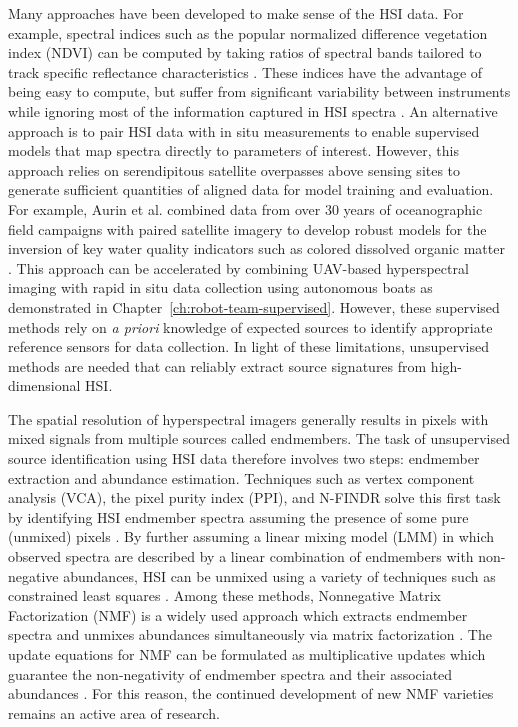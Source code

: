 Many approaches have been developed to make sense of the HSI data. For example,
spectral indices such as the popular normalized difference vegetation index
(NDVI) can be computed by taking ratios of spectral bands tailored to track
specific reflectance characteristics
\cite{thenkabail-indices,thenkabail2018hyperspectral}. These indices have the
advantage of being easy to compute, but suffer from significant variability
between instruments while ignoring most of the information captured in HSI
spectra \cite{ndvi-variability}. An alternative approach is to pair HSI data
with in situ measurements to enable supervised models that map spectra directly
to parameters of interest. However, this approach relies on serendipitous
satellite overpasses above sensing sites to generate sufficient quantities of
aligned data for model training and evaluation. For example, Aurin et al.
combined data from over 30 years of oceanographic field campaigns with paired
satellite imagery to develop robust models for the inversion of key water
quality indicators such as colored dissolved organic matter
\cite{aurin2018remote}. This approach can be accelerated by combining UAV-based
hyperspectral imaging with rapid in situ data collection using autonomous boats
as demonstrated in Chapter~\ref{ch:robot-team-supervised}. However, these
supervised methods rely on \textit{a priori} knowledge of expected sources to
identify appropriate reference sensors for data collection. In light of these
limitations, unsupervised methods are needed that can reliably extract source
signatures from high-dimensional HSI.


The spatial resolution of hyperspectral imagers generally results in pixels with
mixed signals from multiple sources called endmembers. The task of unsupervised
source identification using HSI data therefore involves two steps: endmember
extraction and abundance estimation. Techniques such as vertex component
analysis (VCA), the pixel purity index (PPI), and N-FINDR solve this first task
by identifying HSI endmember spectra assuming the presence of some pure
(unmixed) pixels \cite{vca-orig, ppi-orig, N-FINDR-orig}. By further assuming a
linear mixing model (LMM) in which observed spectra are described by a linear
combination of endmembers with non-negative abundances, HSI can be unmixed using
a variety of techniques such as constrained least squares
\cite{spectral-unmixing-orig, fcls-unmixing}. Among these methods, Nonnegative
Matrix Factorization (NMF) is a widely used approach which extracts endmember
spectra and unmixes abundances simultaneously via matrix factorization
\cite{nmf-orig, unmixing-nmf-review, unmixing-nmf-review-2}. The update
equations for NMF can be formulated as multiplicative updates which guarantee
the non-negativity of endmember spectra and their associated abundances
\cite{nmf-algorithms}.  For this reason, the continued development of new NMF
varieties remains an active area of research.

